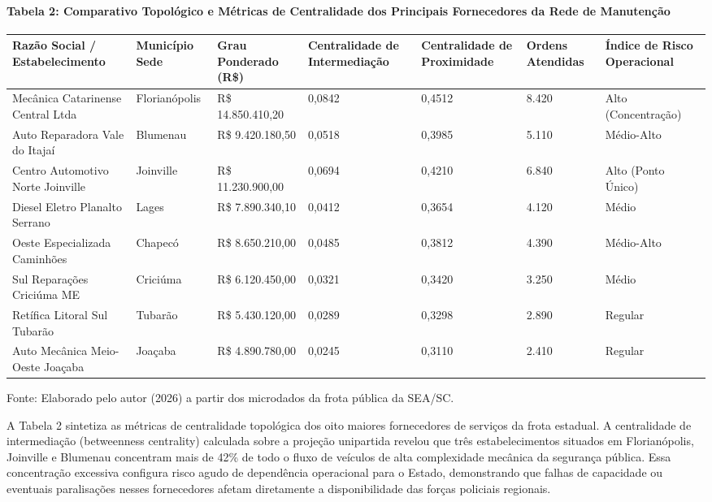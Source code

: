 \documentclass[10pt,a4paper,journal]{article}
\begin{document}
\paragraph{Tabela 2: Comparativo Topológico e Métricas de Centralidade dos Principais Fornecedores da Rede de Manutenção}
\begin{table}[htbp]
\centering
\small
\begin{tabular}{lllllll}
\toprule
Razão Social / Estabelecimento & Município Sede & Grau Ponderado (R\$) & Centralidade de Intermediação & Centralidade de Proximidade & Ordens Atendidas & Índice de Risco Operacional \\
\midrule
Mecânica Catarinense Central Ltda & Florianópolis & R\$ 14.850.410,20 & 0,0842 & 0,4512 & 8.420 & Alto (Concentração) \\
Auto Reparadora Vale do Itajaí & Blumenau & R\$ 9.420.180,50 & 0,0518 & 0,3985 & 5.110 & Médio-Alto \\
Centro Automotivo Norte Joinville & Joinville & R\$ 11.230.900,00 & 0,0694 & 0,4210 & 6.840 & Alto (Ponto Único) \\
Diesel Eletro Planalto Serrano & Lages & R\$ 7.890.340,10 & 0,0412 & 0,3654 & 4.120 & Médio \\
Oeste Especializada Caminhões & Chapecó & R\$ 8.650.210,00 & 0,0485 & 0,3812 & 4.390 & Médio-Alto \\
Sul Reparações Criciúma ME & Criciúma & R\$ 6.120.450,00 & 0,0321 & 0,3420 & 3.250 & Médio \\
Retífica Litoral Sul Tubarão & Tubarão & R\$ 5.430.120,00 & 0,0289 & 0,3298 & 2.890 & Regular \\
Auto Mecânica Meio-Oeste Joaçaba & Joaçaba & R\$ 4.890.780,00 & 0,0245 & 0,3110 & 2.410 & Regular \\
\bottomrule
\end{tabular}
\end{table}
Fonte: Elaborado pelo autor (2026) a partir dos microdados da frota pública da SEA/SC.

A Tabela 2 sintetiza as métricas de centralidade topológica dos oito maiores fornecedores de serviços da frota estadual. A centralidade de intermediação (betweenness centrality) calculada sobre a projeção unipartida revelou que três estabelecimentos situados em Florianópolis, Joinville e Blumenau concentram mais de 42\% de todo o fluxo de veículos de alta complexidade mecânica da segurança pública. Essa concentração excessiva configura risco agudo de dependência operacional para o Estado, demonstrando que falhas de capacidade ou eventuais paralisações nesses fornecedores afetam diretamente a disponibilidade das forças policiais regionais.
\end{document}
